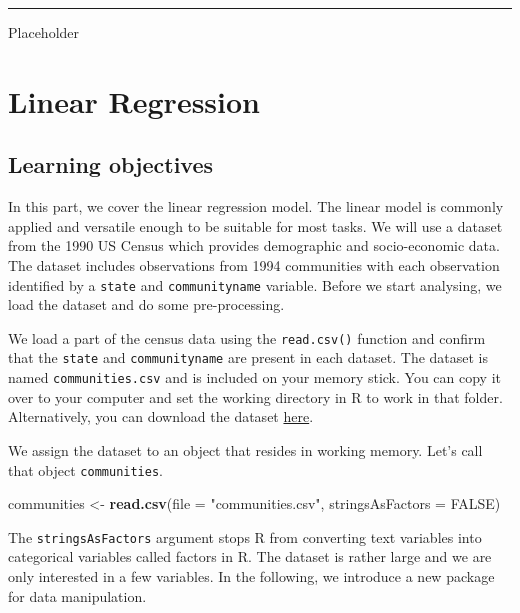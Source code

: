 \documentclass[]{article}
\newenvironment{Shaded}{\begin{snugshade}}{\end{snugshade}}
\newcommand{\DataTypeTok}[1]{\textcolor[rgb]{0.13,0.29,0.53}{#1}}
\newcommand{\KeywordTok}[1]{\textcolor[rgb]{0.13,0.29,0.53}{\textbf{#1}}}
\newcommand{\NormalTok}[1]{#1}
\newcommand{\OtherTok}[1]{\textcolor[rgb]{0.56,0.35,0.01}{#1}}
\newcommand{\StringTok}[1]{\textcolor[rgb]{0.31,0.60,0.02}{#1}}
\begin{document}
\begin{center}\rule{0.5\linewidth}{\linethickness}\end{center}

Placeholder

\hypertarget{linear-regression}{%
\section{Linear Regression}\label{linear-regression}}

\hypertarget{learning-objectives}{%
\subsection{Learning objectives}\label{learning-objectives}}

In this part, we cover the linear regression model. The linear model is commonly applied and versatile enough to be suitable for most tasks. We will use a dataset from the 1990 US Census which provides demographic and socio-economic data. The dataset includes observations from 1994 communities with each observation identified by a \texttt{state} and \texttt{communityname} variable. Before we start analysing, we load the dataset and do some pre-processing.

We load a part of the census data using the \texttt{read.csv()} function and confirm that the \texttt{state} and \texttt{communityname} are present in each dataset. The dataset is named \texttt{communities.csv} and is included on your memory stick. You can copy it over to your computer and set the working directory in R to work in that folder. Alternatively, you can download the dataset \href{http://philippbroniecki.github.io/ML2017.io/data/communities.csv}{here}.

We assign the dataset to an object that resides in working memory. Let's call that object \texttt{communities}.

\begin{Shaded}
\begin{Highlighting}[]
\NormalTok{communities <-}\StringTok{ }\KeywordTok{read.csv}\NormalTok{(}\DataTypeTok{file =} \StringTok{"communities.csv"}\NormalTok{, }\DataTypeTok{stringsAsFactors =} \OtherTok{FALSE}\NormalTok{)}
\end{Highlighting}
\end{Shaded}

The \texttt{stringsAsFactors} argument stops R from converting text variables into categorical variables called factors in R. The dataset is rather large and we are only interested in a few variables. In the following, we introduce a new package for data manipulation.
\end{document}
